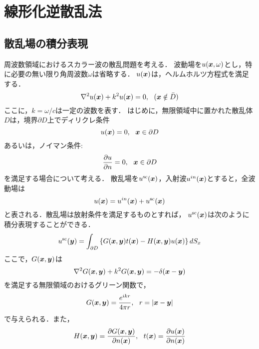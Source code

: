 \section{線形化逆散乱法}
\subsection{散乱場の積分表現}
周波数領域におけるスカラー波の散乱問題を考える．
波動場を$u(\mbox{\boldmath $x$},\omega)$とし，特に必要の無い限り角周波数$\omega$は省略する．
$u(\mbox{\boldmath $x$})$は，ヘルムホルツ方程式を満足する．
\begin{equation}
	\nabla^2 u(\fat{x}) + k^2 u(\fat{x}) =0, \ \ (\fat{x} \notin \bar{D})
	\label{eqn:}
\end{equation}
ここに，$k=\omega/c$は一定の波数を表す．
はじめに，無限領域中に置かれた散乱体$D$は，境界$\partial D$上でディリクレ条件
\begin{equation}
	u(\mbox{\boldmath $x$}) = 0, \ \ \mbox{\boldmath $x$}\in \partial D
	\label{eqn:}
\end{equation}
あるいは，ノイマン条件:
\begin{equation}
	\frac{\partial u}{\partial n} = 0 ,\ \ \mbox{\boldmath $x$}\in \partial D
	\label{eqn:}
\end{equation}
を満足する場合について考える．
散乱場を$u^{\rm sc}(\mbox{\boldmath $x$})$，入射波$u^{in}(\mbox{\boldmath $x$})$とすると，全波動場は
\begin{equation}
	u(\mbox{\boldmath $x$})=u^{in}(\mbox{\boldmath $x$})+ u^{\rm sc}(\mbox{\boldmath $x$})
	\label{eqn:}
\end{equation}
と表される．散乱場は放射条件を満足するものとすれば，
$u^{\rm sc}(\mbox{\boldmath $x$})$は次のように積分表現することができる．
\begin{equation}
	u^{\rm sc}(\mbox{\boldmath $y$}) = \int _{\partial D} 
	\left\{
		G(\mbox{\boldmath $x$},\mbox{\boldmath $y$})t(\mbox{\boldmath $x$})
	-
		H(\mbox{\boldmath $x$},\mbox{\boldmath $y$})u(\mbox{\boldmath $x$})
	\right\} dS_x
	\label{eqn:}
\end{equation}
ここで，$G(\mbox{\boldmath $x$},\mbox{\boldmath $y$})$は
\begin{equation}
	\nabla^2 G(\mbox{\boldmath $x$},\mbox{\boldmath $y$}) + k^2 G(\mbox{\boldmath $x$},\mbox{\boldmath $y$}) =-\delta (\mbox{\boldmath $x$}-\mbox{\boldmath $y$} )
	\label{eqn:}
\end{equation}
を満足する無限領域のおけるグリーン関数で，
\begin{equation}
	G(\mbox{\boldmath $x$},\mbox{\boldmath $y$}) =\frac{e^{ikr}}{4\pi r}, \ \ r=\left| \mbox{\boldmath $x$}-\mbox{\boldmath $y$} \right|
	\label{eqn:Green}
\end{equation}
で与えられる．また，
\begin{equation}
	H(\fat{x},\fat{y}) = \frac{\partial G(\fat{x},\fat{y})}{\partial n(\fat{x})}, \ \ 
	t(\fat{x}) =\frac{\partial u(\fat{x})}{\partial n(\fat{x})}
	\label{eqn:}
\end{equation}
